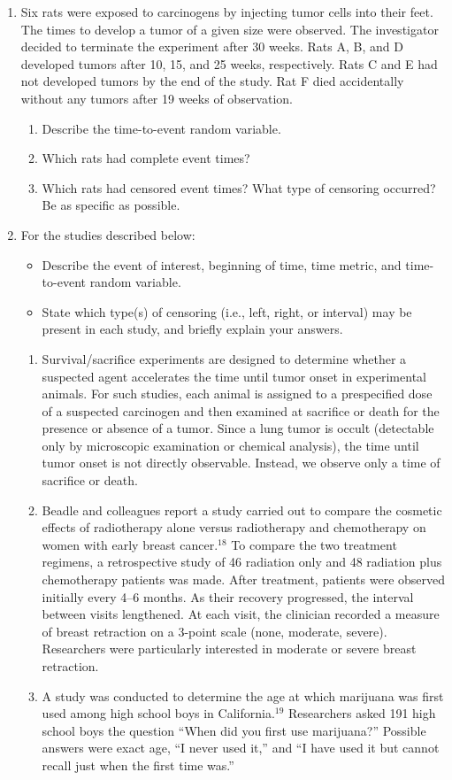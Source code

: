 \documentclass[
]{report}
\begin{document}
\begin{enumerate}
  \item Six rats were exposed to carcinogens by injecting tumor cells into their feet. The times to develop a tumor of a given size were observed. The investigator decided to terminate the experiment after 30 weeks. Rats A, B, and D developed tumors after 10, 15, and 25 weeks, respectively. Rats C and E had not developed tumors by the end of the study. Rat F died accidentally without any tumors after 19 weeks of observation.
  \begin{enumerate}
    \item Describe the time-to-event random variable.
    \item Which rats had complete event times?
    \item Which rats had censored event times? What type of censoring occurred? Be as specific as possible.
  \end{enumerate}

  \item For the studies described below:
  \begin{itemize}
    \item Describe the event of interest, beginning of time, time metric, and time-to-event random variable.
    \item State which type(s) of censoring (i.e., left, right, or interval) may be present in each study, and briefly explain your answers.
  \end{itemize}
  \begin{enumerate}
    \item Survival/sacrifice experiments are designed to determine whether a suspected agent accelerates the time until tumor onset in experimental animals. For such studies, each animal is assigned to a prespecified dose of a suspected carcinogen and then examined at sacrifice or death for the presence or absence of a tumor. Since a lung tumor is occult (detectable only by microscopic examination or chemical analysis), the time until tumor onset is not directly observable. Instead, we observe only a time of sacrifice or death.
    \item Beadle and colleagues report a study carried out to compare the cosmetic effects of radiotherapy alone versus radiotherapy and chemotherapy on women with early breast cancer.$^{18}$ To compare the two treatment regimens, a retrospective study of 46 radiation only and 48 radiation plus chemotherapy patients was made. After treatment, patients were observed initially every 4–6 months. As their recovery progressed, the interval between visits lengthened. At each visit, the clinician recorded a measure of breast retraction on a 3-point scale (none, moderate, severe). Researchers were particularly interested in moderate or severe breast retraction.
    \item A study was conducted to determine the age at which marijuana was first used among high school boys in California.$^{19}$ Researchers asked 191 high school boys the question ``When did you first use marijuana?'' Possible answers were exact age, ``I never used it,'' and ``I have used it but cannot recall just when the first time was.''
  \end{enumerate}


\end{enumerate}
\end{document}
